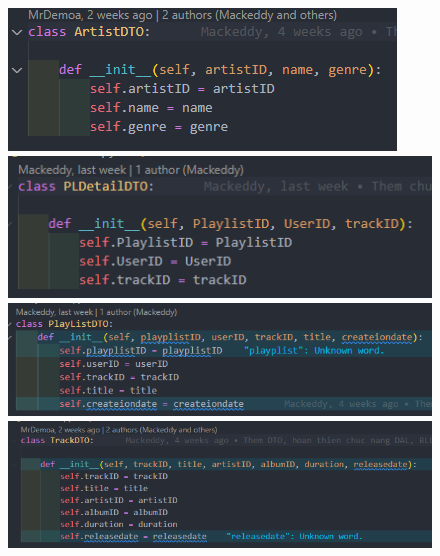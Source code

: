 \documentclass[a4paper]{article}
\begin{document}
\begin{flushleft}
	\begin{figure}[h]
		\includegraphics[width=\textwidth]{images/ArtistDTO.png}
		\includegraphics[width=\textwidth]{images/PlayListDetailDTO.png}
		\includegraphics[width=\textwidth]{images/PlayListDTO.png}
		\includegraphics[width=\textwidth]{images/TrackDTO.png}
	\end{figure}
\end{flushleft}
\clearpage
\end{document}
